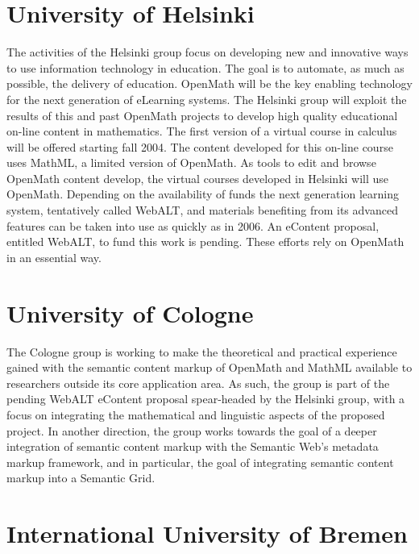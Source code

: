 \section{University of Helsinki}

The activities of the Helsinki group focus on developing new and
innovative ways to use information technology in education.    The goal
is to automate, as much as possible, the delivery of education. OpenMath
will be the key enabling technology for the next generation of eLearning
systems.  The Helsinki group will exploit the results of this and past
OpenMath projects to develop high quality educational on-line content in
mathematics.  The first version of a virtual course in calculus will be
offered starting fall 2004.  The content developed for this on-line
course uses MathML, a limited version of OpenMath.  As tools to edit and
browse OpenMath content develop, the virtual courses developed in
Helsinki will use OpenMath.  Depending on the availability of funds the
next generation learning system, tentatively called WebALT,  and
materials benefiting from its advanced features can be taken into use as
quickly  as in 2006.  An eContent proposal, entitled WebALT,   to fund
this work is pending.  These efforts rely on OpenMath in an essential
way. 

\section{University of Cologne}

The Cologne group is working to make the theoretical and practical
experience gained with the semantic content markup of OpenMath and
MathML available to researchers outside its core application area.  As
such, the group is part of the pending WebALT eContent proposal
spear-headed by the Helsinki group, with a focus on integrating the
mathematical and linguistic aspects of the proposed project.  In another
direction, the group works towards the goal of a deeper integration of
semantic content markup with the Semantic Web's metadata markup
framework, and in particular, the goal of integrating semantic content
markup into a Semantic Grid.


\section{International University of Bremen}

